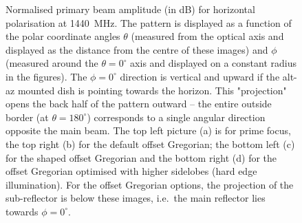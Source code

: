 \documentclass{aa}
\begin{document}
\begin{figure}
  \caption{\label{fig:pb180}Normalised primary beam amplitude (in dB) for
    horizontal polarisation at 1440~MHz.  The pattern is displayed as a function
    of the polar coordinate angles $\theta$ (measured from the optical axis and
    displayed as the distance from the centre of these images) and $\phi$
    (measured around the $\theta=0^\circ$ axis and displayed on a constant
    radius in the figures).  The $\phi=0^\circ$ direction is vertical and upward
    if the alt-az mounted dish is pointing towards the horizon.  This
    "projection" opens the back half of the pattern outward -- the entire
    outside border (at $\theta=180^\circ$) corresponds to a single angular
    direction opposite the main beam. The top left picture (a) is for prime focus,
    the top right (b) for the default offset Gregorian; the bottom left (c) for the
    shaped offset Gregorian and the bottom right (d) for the offset Gregorian
    optimised with higher sidelobes (hard edge illumination).  For the offset
    Gregorian options, the projection of the sub-reflector is below these
    images, i.e.\ the main reflector lies towards $\phi=0^\circ$.}
\end{figure}
\end{document}

